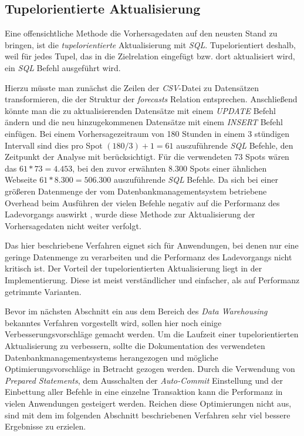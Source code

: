 \subsection{Tupelorientierte Aktualisierung}
Eine offensichtliche Methode die Vorhersagedaten auf den neusten Stand
zu bringen, ist die \textit{tupelorientierte} Aktualisierung mit
\textit{SQL}. Tupelorientiert deshalb, weil für jedes Tupel, das in
die Zielrelation eingefügt bzw. dort aktualisiert wird, ein
\textit{SQL} Befehl ausgeführt wird.

Hierzu müsste man zunächst die Zeilen der \textit{CSV}-Datei zu
Datensätzen transformieren, die der Struktur der \textit{forecasts}
Relation entsprechen. Anschließend könnte man die zu aktualisierenden
Datensätze mit einem \textit{UPDATE} Befehl ändern und die neu
hinzugekommenen Datensätze mit einem \textit{INSERT} Befehl
einfügen. Bei einem Vorhersagezeitraum von 180 Stunden in einem 3
stündigen Intervall sind dies pro Spot $(180 / 3) + 1 = 61$
auszuführende \textit{SQL} Befehle, den Zeitpunkt der Analyse mit
berücksichtigt. Für die verwendeten 73 Spots wären das $61 * 73 =
4.453$, bei den zuvor erwähnten 8.300 Spots einer ähnlichen Webseite
$61 * 8.300 = 506.300$ auszuführende \textit{SQL} Befehle. Da sich bei
einer größeren Datenmenge der vom Datenbankmanagementsystem
betriebene Overhead beim Ausführen der vielen Befehle negativ auf die
Performanz des Ladevorgangs auswirkt \cite{postgresql:populate}, wurde
diese Methode zur Aktualisierung der Vorhersagedaten nicht weiter
verfolgt.

Das hier beschriebene Verfahren eignet sich für Anwendungen, bei denen
nur eine geringe Datenmenge zu verarbeiten und die Performanz des
Ladevorgangs nicht kritisch ist. Der Vorteil der tupelorientierten
Aktualisierung liegt in der Implementierung. Diese ist meist
verständlicher und einfacher, als auf Performanz getrimmte Varianten.

Bevor im nächsten Abschnitt ein aus dem Bereich des \textit{Data
  Warehousing} bekanntes Verfahren vorgestellt wird, sollen hier noch
einige Verbesserungsvorschläge gemacht werden. Um die Laufzeit einer
tupelorientierten Aktualisierung zu verbessern, sollte die
Dokumentation des verwendeten Datenbankmanagementsystems
herangezogen und mögliche Optimierungsvorschläge in Betracht gezogen
werden. Durch die Verwendung von \textit{Prepared Statements}, dem
Ausschalten der \textit{Auto-Commit} Einstellung und der Einbettung
aller Befehle in eine einzelne Transaktion kann die Performanz in
vielen Anwendungen gesteigert werden. Reichen diese Optimierungen
nicht aus, sind mit dem im folgenden Abschnitt beschriebenen Verfahren
sehr viel bessere Ergebnisse zu erzielen.


